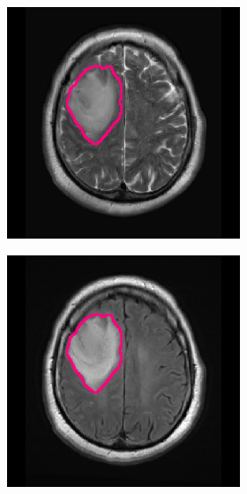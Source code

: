 \begin{subappendices}
\begin{figure}[htbp]
\begin{subfigure}[b]{0.8\textwidth}
\begin{subfigure}[b]{0.215\textwidth}
        \end{subfigure}
        \hfill
        \begin{subfigure}[b]{0.215\textwidth}
        \includegraphics[width=\textwidth, clip, trim=2.5cm 0.5cm 2.5cm 0.5cm]{Figures/Random_segs/T2_TCGA-HT-7475.png}
        \end{subfigure}
        \hfill
        \begin{subfigure}[b]{0.215\textwidth}
        \includegraphics[width=\textwidth, clip, trim=2.5cm 0.5cm 2.5cm 0.5cm]{Figures/Random_segs/FLAIR_TCGA-HT-7475.png}

\end{subfigure}
\end{subfigure}
\end{figure}
\end{subappendices}
